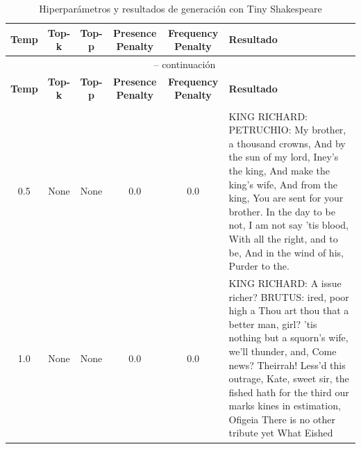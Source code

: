 \documentclass[11pt]{book}
\begin{document}
\begin{longtable}{ccccc p{12cm}}
    \caption{Hiperparámetros y resultados de generación con Tiny Shakespeare}
    \label{tab:resultados_validacion_shakespeare} \\
    \toprule
    \textbf{Temp} & \textbf{Top-k} & \textbf{Top-p} &
    \textbf{Presence Penalty} & \textbf{Frequency Penalty} & \textbf{Resultado} \\
    \midrule
    \endfirsthead
    
    \multicolumn{6}{c}{{\tablename\ \thetable{} -- continuación}} \\
    \toprule
    \textbf{Temp} & \textbf{Top-k} & \textbf{Top-p} &
    \textbf{Presence Penalty} & \textbf{Frequency Penalty} & \textbf{Resultado} \\
    \midrule
    \endhead
    
    \bottomrule
    \multicolumn{6}{r}{} \\
    \endfoot
    
    \bottomrule
    \endlastfoot
    
    0.5 & None & None & 0.0 & 0.0 &
    KING RICHARD:\newline
    PETRUCHIO:\newline
    My brother, a thousand crowns,\newline
    And by the sun of my lord,\newline
    Iney’s the king,\newline
    And make the king’s wife,\newline
    And from the king,\newline
    You are sent for your brother.\newline
    In the day to be not, I am not say ’tis blood,\newline
    With all the right, and to be,\newline
    And in the wind of his,\newline
    Purder to the.\\
    
    1.0 & None & None & 0.0 & 0.0 &
    KING RICHARD:\newline
    A issue richer?\newline
    BRUTUS:\newline
    ired, poor high a\newline
    Thou art thou that a better man, girl?\newline
    'tis nothing but a squorn's wife, we'll thunder, and,\newline
    Come news?\newline
    Theirrah!\newline
    Less'd this outrage, Kate, sweet sir, the fished hath for the third our marks kines in estimation,\newline
    Ofigeia\newline
    There is no other tribute yet\newline
    What Eished\\
    

\end{longtable}
\end{document}
